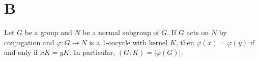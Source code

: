 %
%
%
%
%
%
%

\section*{B}

\begin{lemma}
	\label{lemma:1cocycle}
	Let $G$ be a group and $N$ be a normal subgroup of $G$. If $G$ acts on $N$ by conjugation and  
	$\varphi\colon G\to N$ is a 1-cocycle with kernel $K$, then 
	$\varphi(x)=\varphi(y)$ if and only if $xK=yK$. In particular,
	$(G:K)=|\varphi(G)|$. 
\end{lemma}

